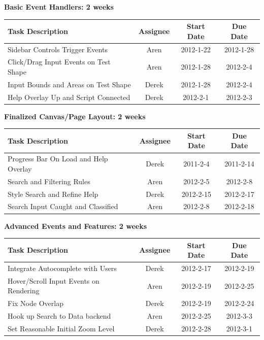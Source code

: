 \documentclass[12pt, letterpaper]{article}
\begin{document}
  \begin{center}
		{\bf Basic Event Handlers: 2 weeks}
    \begin{tabular}{| p{8.3cm} || c | c | c | }
      \hline
      Task Description & Assignee & Start Date & Due Date \\
      \hline
 	    Sidebar Controls Trigger Events & Aren & 2012-1-22 & 2012-1-28 \\
	    Click/Drag Input Events on Test Shape & Aren & 2012-1-28 & 2012-2-4 \\
	    Input Bounds and Areas on Test Shape & Derek & 2012-1-28 & 2012-2-4 \\
        Help Overlay Up and Script Connected & Derek & 2012-2-1 & 2012-2-3 \\
      \hline
    \end{tabular}
  \end{center}

  \begin{center}
		{\bf Finalized Canvas/Page Layout: 2 weeks}
    \begin{tabular}{| p{8.3cm} || c | c | c | }
      \hline
      Task Description & Assignee & Start Date & Due Date \\
      \hline
		Progress Bar On Load and Help Overlay & Derek & 2011-2-4 & 2011-2-14 \\
	    Search and Filtering Rules & Aren & 2012-2-5 & 2012-2-8 \\
	    Style Search and Refine Help & Derek & 2012-2-15 & 2012-2-17 \\
	    Search Input Caught and Classified & Aren & 2012-2-8 & 2012-2-18 \\
      \hline
    \end{tabular}
  \end{center}

  \begin{center}
		{\bf Advanced Events and Features: 2 weeks}
    \begin{tabular}{| p{8.3cm} || c | c | c | }
      \hline
      Task Description & Assignee & Start Date & Due Date \\
      \hline
        Integrate Autocomplete with Users & Derek & 2012-2-17 & 2012-2-19 \\
	    Hover/Scroll Input Events on Rendering & Aren & 2012-2-19 & 2012-2-25 \\
	    Fix Node Overlap & Derek & 2012-2-19 & 2012-2-24 \\
	    Hook up Search to Data backend & Aren & 2012-2-25 & 2012-3-3 \\
        Set Reasonable Initial Zoom Level & Derek & 2012-2-28 & 2012-3-1 \\
      \hline
    \end{tabular}
  \end{center}
\end{document}
